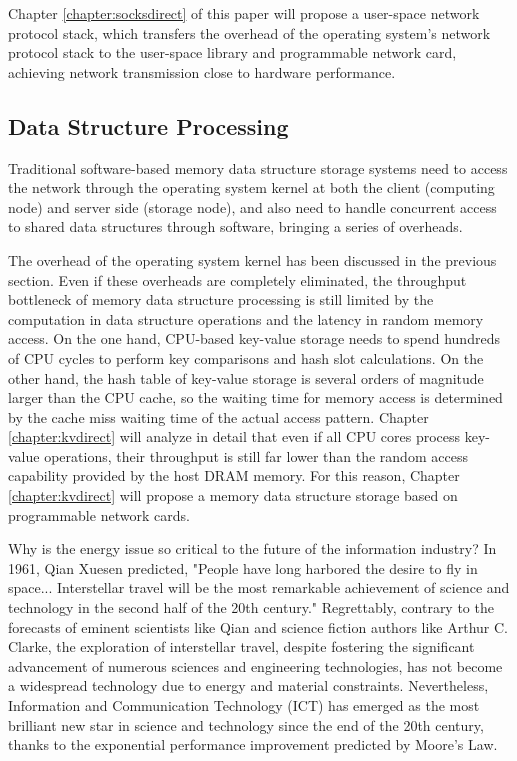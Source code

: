 Chapter \ref{chapter:socksdirect} of this paper will propose a user-space network protocol stack, which transfers the overhead of the operating system's network protocol stack to the user-space library and programmable network card, achieving network transmission close to hardware performance.

\subsection{Data Structure Processing}

Traditional software-based memory data structure storage systems need to access the network through the operating system kernel at both the client (computing node) and server side (storage node), and also need to handle concurrent access to shared data structures through software, bringing a series of overheads.

The overhead of the operating system kernel has been discussed in the previous section. Even if these overheads are completely eliminated, the throughput bottleneck of memory data structure processing is still limited by the computation in data structure operations and the latency in random memory access. On the one hand, CPU-based key-value storage needs to spend hundreds of CPU cycles to perform key comparisons and hash slot calculations. On the other hand, the hash table of key-value storage is several orders of magnitude larger than the CPU cache, so the waiting time for memory access is determined by the cache miss waiting time of the actual access pattern. Chapter \ref{chapter:kvdirect} will analyze in detail that even if all CPU cores process key-value operations, their throughput is still far lower than the random access capability provided by the host DRAM memory. For this reason, Chapter \ref{chapter:kvdirect} will propose a memory data structure storage based on programmable network cards.

Why is the energy issue so critical to the future of the information industry?
In 1961, Qian Xuesen predicted, "People have long harbored the desire to fly in space... Interstellar travel will be the most remarkable achievement of science and technology in the second half of the 20th century." \cite{qianxuesen}
Regrettably, contrary to the forecasts of eminent scientists like Qian and science fiction authors like Arthur C. Clarke, the exploration of interstellar travel, despite fostering the significant advancement of numerous sciences and engineering technologies, has not become a widespread technology due to energy and material constraints.
Nevertheless, Information and Communication Technology (ICT) has emerged as the most brilliant new star in science and technology since the end of the 20th century, thanks to the exponential performance improvement predicted by Moore's Law.

